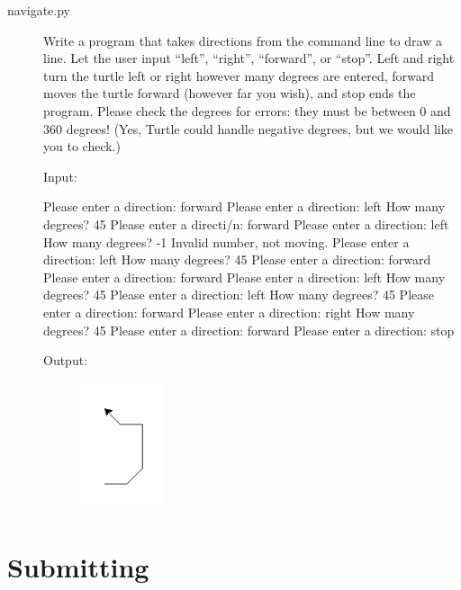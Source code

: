 \documentclass[11pt]{cselabheader}
\begin{document}
\begin{description}
  \item[navigate.py] Write a program that takes directions from the command line
    to draw a line. Let the user input ``left'', ``right'', ``forward'', or
    ``stop''. Left and right turn the turtle left or right however many degrees
    are entered, forward moves the turtle forward (however far you wish), and
    stop ends the program. Please check the degrees for errors: they must be
    between 0 and 360 degrees! (Yes, Turtle could handle negative degrees, but
    we would like you to check.)

    Input:

  \begin{bashcode}
Please enter a direction: forward
Please enter a direction: left
How many degrees? 45
Please enter a directi/n: forward
Please enter a direction: left
How many degrees? -1
Invalid number, not moving.
Please enter a direction: left
How many degrees? 45
Please enter a direction: forward
Please enter a direction: forward
Please enter a direction: left
How many degrees? 45
Please enter a direction: left
How many degrees? 45
Please enter a direction: forward
Please enter a direction: right
How many degrees? 45
Please enter a direction: forward
Please enter a direction: stop
  \end{bashcode}

    Output:
  \begin{figure}[!ht]
    \centering
    \includegraphics[width=1.0in]{img/navigate}
  \end{figure}


\end{description}

\pagebreak

\section{Submitting}
\end{document}
